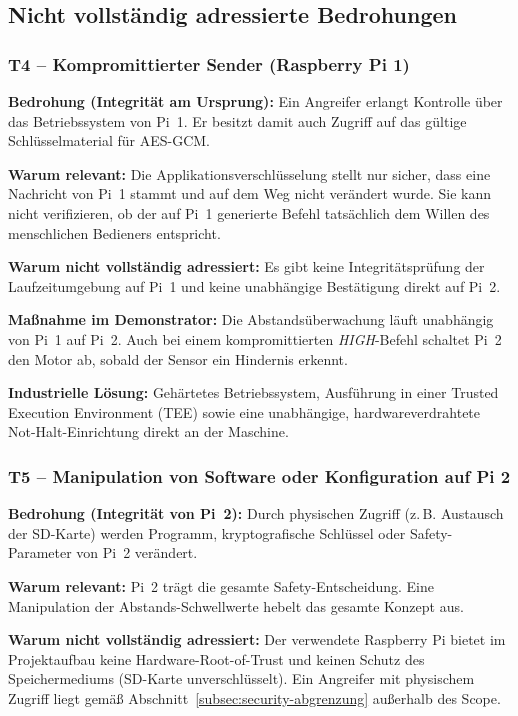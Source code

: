 \subsection{Nicht vollständig adressierte Bedrohungen}

\subsubsection*{T4 -- Kompromittierter Sender (Raspberry Pi 1)}

\textbf{Bedrohung (Integrität am Ursprung):} Ein Angreifer erlangt Kontrolle
über das Betriebssystem von Pi~1. Er besitzt damit auch Zugriff auf das
gültige Schlüsselmaterial für AES-GCM.

\textbf{Warum relevant:} Die Applikationsverschlüsselung stellt nur sicher,
dass eine Nachricht von Pi~1 stammt und auf dem Weg nicht verändert wurde. Sie
kann nicht verifizieren, ob der auf Pi~1 generierte Befehl tatsächlich dem
Willen des menschlichen Bedieners entspricht.

\textbf{Warum nicht vollständig adressiert:} Es gibt keine Integritätsprüfung
der Laufzeitumgebung auf Pi~1 und keine unabhängige Bestätigung direkt auf Pi~2.

\textbf{Maßnahme im Demonstrator:} Die Abstandsüberwachung läuft unabhängig
von Pi~1 auf Pi~2. Auch bei einem kompromittierten \textit{HIGH}-Befehl schaltet Pi~2
den Motor ab, sobald der Sensor ein Hindernis erkennt.

\textbf{Industrielle Lösung:} Gehärtetes Betriebssystem, Ausführung in
einer Trusted Execution Environment (TEE) sowie eine unabhängige,
hardwareverdrahtete Not-Halt-Einrichtung direkt an der Maschine.

\subsubsection*{T5 -- Manipulation von Software oder Konfiguration auf Pi 2}

\textbf{Bedrohung (Integrität von Pi~2):} Durch physischen Zugriff
(z.\,B. Austausch der SD-Karte) werden Programm, kryptografische Schlüssel oder
Safety-Parameter von Pi~2 verändert.

\textbf{Warum relevant:} Pi~2 trägt die gesamte Safety-Entscheidung. Eine
Manipulation der Abstands-Schwellwerte hebelt das gesamte Konzept aus.

\textbf{Warum nicht vollständig adressiert:} Der verwendete Raspberry Pi
bietet im Projektaufbau keine Hardware-Root-of-Trust und keinen Schutz
des Speichermediums (SD-Karte unverschlüsselt). Ein Angreifer mit physischem
Zugriff liegt gemäß Abschnitt~\ref{subsec:security-abgrenzung} außerhalb des
Scope.

